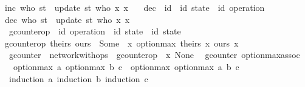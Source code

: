 \begin{isabellebody}
{\isachardoublequoteopen}inc\ who\ st\ {\isacharequal}\ update\ st\ who\ {\isacharparenleft}{\isasymlambda}x{\isachardot}\ x\ {\isacharplus}\ {}{\isacharparenright}{\isachardoublequoteclose}\isanewline
\isanewline
{}\isamarkupfalse%
\ dec\ {\isacharcolon}{\isacharcolon}\ {\isachardoublequoteopen}{\isacharprime}id\ {\isasymRightarrow}\ {\isacharparenleft}{\isacharprime}id\ state{\isacharparenright}\ {\isasymRightarrow}\ {\isacharparenleft}{\isacharprime}id\ operation{\isacharparenright}{\isachardoublequoteclose}\ \ \isanewline
{\isachardoublequoteopen}dec\ who\ st\ {\isacharequal}\ update\ st\ who\ {\isacharparenleft}{\isasymlambda}x{\isachardot}\ x\ {\isacharminus}\ {}{\isacharparenright}{\isachardoublequoteclose}\isanewline
\isanewline
{}\isamarkupfalse%
\ gcounter{\isacharunderscore}op\ {\isacharcolon}{\isacharcolon}\ {\isachardoublequoteopen}{\isacharparenleft}{\isacharprime}id\ operation{\isacharparenright}\ {\isasymRightarrow}\ {\isacharparenleft}{\isacharprime}id\ state{\isacharparenright}\ {\isasymrightharpoonup}\ {\isacharparenleft}{\isacharprime}id\ state{\isacharparenright}{\isachardoublequoteclose}\ \isanewline
{\isachardoublequoteopen}gcounter{\isacharunderscore}op\ theirs\ ours\ {\isacharequal}\ Some\ {\isacharparenleft}{\isasymlambda}\ x{\isachardot}\ option{\isacharunderscore}max\ {\isacharparenleft}theirs\ x{\isacharparenright}\ {\isacharparenleft}ours\ x{\isacharparenright}{\isacharparenright}{\isachardoublequoteclose}\isanewline
\isanewline
{}\isamarkupfalse%
\ gcounter\ {\isacharequal}\ network{\isacharunderscore}with{\isacharunderscore}ops\ {\isacharunderscore}\ gcounter{\isacharunderscore}op\ {\isachardoublequoteopen}{\isasymlambda}\ x{\isachardot}\ None{\isachardoublequoteclose}\isanewline
\isanewline
{}\isamarkupfalse%
\ {\isacharparenleft}\ gcounter{\isacharparenright}\ option{\isacharunderscore}max{\isacharunderscore}assoc{\isacharcolon}\isanewline
\ \ {\isachardoublequoteopen}option{\isacharunderscore}max\ a\ {\isacharparenleft}option{\isacharunderscore}max\ b\ c{\isacharparenright}\ {\isacharequal}\ option{\isacharunderscore}max\ {\isacharparenleft}option{\isacharunderscore}max\ a\ b{\isacharparenright}\ c{\isachardoublequoteclose}\isanewline
%
\isadelimproof
\ \ %
\endisadelimproof
%
\isatagproof
{}\isamarkupfalse%
\ {\isacharparenleft}induction\ a{\isacharsemicolon}\ induction\ b{\isacharsemicolon}\ induction\ c{\isacharparenright}\isanewline
\ \ \isamarkupfalse%

\end{isabellebody}
